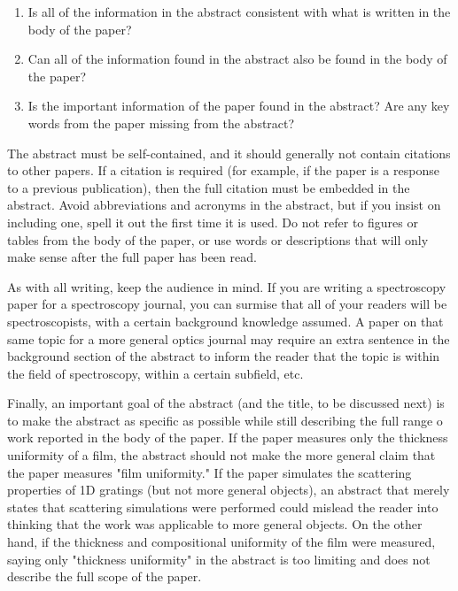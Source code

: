 \begin{enumerate}
  \item Is all of the information in the abstract consistent with what is written in the body of the paper?

  \item Can all of the information found in the abstract also be found in the body of the paper?

  \item Is the important information of the paper found in the abstract? Are any key words from the paper missing from the abstract?

\end{enumerate}

The abstract must be self-contained, and it should generally not contain citations to other papers. If a citation is required (for example, if the paper is a response to a previous publication), then the full citation must be embedded in the abstract. Avoid abbreviations and acronyms in the abstract, but if you insist on including one, spell it out the first time it is used. Do not refer to figures or tables from the body of the paper, or use words or descriptions that will only make sense after the full paper has been read.

As with all writing, keep the audience in mind. If you are writing a spectroscopy paper for a spectroscopy journal, you can surmise that all of your readers will be spectroscopists, with a certain background knowledge assumed. A paper on that same topic for a more general optics journal may require an extra sentence in the background section of the abstract to inform the reader that the topic is within the field of spectroscopy, within a certain subfield, etc.

Finally, an important goal of the abstract (and the title, to be discussed next) is to make the abstract as specific as possible while still describing the full range o work reported in the body of the paper. If the paper measures only the thickness uniformity of a film, the abstract should not make the more general claim that the paper measures "film uniformity." If the paper simulates the scattering properties of 1D gratings (but not more general objects), an abstract that merely states that scattering simulations were performed could mislead the reader into thinking that the work was applicable to more general objects. On the other hand, if the thickness and compositional uniformity of the film were measured, saying only "thickness uniformity" in the abstract is too limiting and does not describe the full scope of the paper.

